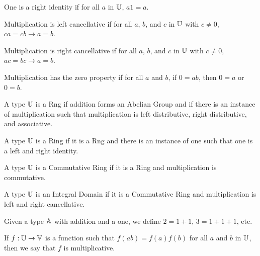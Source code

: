 \documentclass[../../math.tex]{subfiles}
\begin{document}
\begin{class}
    One is a right identity if for all $a$ in $\mathbb{U}$, $a1 = a$.
\end{class}

\begin{class}
    Multiplication is left cancellative if for all $a$, $b$, and $c$ in $\mathbb{U}$
    with $c \neq 0$, $ca = cb \rightarrow a = b$.
\end{class}

\begin{class}
    Multiplication is right cancellative if for all $a$, $b$, and $c$ in $\mathbb{U}$
    with $c \neq 0$, $ac = bc \rightarrow a = b$.
\end{class}

\begin{class}
    Multiplication has the zero property if for all $a$ and $b$, if $0 = ab$,
    then $0 = a$ or $0 = b$.
\end{class}

\begin{class}[Rng]
    A type $\mathbb{U}$ is a Rng if addition forms an Abelian Group and if there is an
    instance of multiplication such that multiplication is left distributive,
    right distributive, and associative.
\end{class}

\begin{class}[Ring]
    A type $\mathbb{U}$ is a Ring if it is a Rng and there is an instance of one such
    that one is a left and right identity.
\end{class}

\begin{class}
    A type $\mathbb{U}$ is a Commutative Ring if it is a Ring and multiplication is
    commutative.
\end{class}

\begin{class}
    A type $\mathbb{U}$ is an Integral Domain if it is a Commutative Ring and
    multiplication is left and right cancellative.
\end{class}

\begin{definition}
    Given a type $\mathbb{A}$ with addition and a one, we define $2 = 1 + 1$, $3 = 1 +
    1 + 1$, etc.
\end{definition}

\begin{class}
    If $f : \mathbb{U} \to \mathbb{V}$ is a function such that $f(ab) = f(a)f(b)$ for all $a$
    and $b$ in $\mathbb{U}$, then we say that $f$ is multiplicative.
\end{class}
\end{document}
